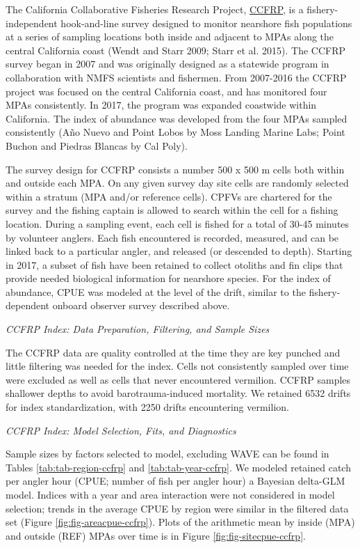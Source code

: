 \documentclass[11pt,
  english,
  a4paper,
]{article}
\begin{document}
The California Collaborative Fisheries Research Project, {\href{https://www.mlml.calstate.edu/ccfrp/}{CCFRP}\leavevmode\tagmcend\tagstructend}, is a fishery-independent hook-and-line survey designed to monitor nearshore fish populations at a series of sampling locations both inside and adjacent to MPAs along the central California coast {(Wendt and Starr 2009; Starr et al. 2015)\leavevmode\tagmcend\tagstructend}. The CCFRP survey began in 2007 and was originally designed as a statewide program in collaboration with NMFS scientists and fishermen. From 2007-2016 the CCFRP project was focused on the central California coast, and has monitored four MPAs consistently. In 2017, the program was expanded coastwide within California. The index of abundance was developed from the four MPAs sampled consistently (Año Nuevo and Point Lobos by Moss Landing Marine Labs; Point Buchon and Piedras Blancas by Cal Poly).

The survey design for CCFRP consists a number 500 x 500 m cells both within and outside each MPA. On any given survey day site cells are randomly selected within a stratum (MPA and/or reference cells). CPFVs are chartered for the survey and the fishing captain is allowed to search within the cell for a fishing location. During a sampling event, each cell is fished for a total of 30-45 minutes by volunteer anglers. Each fish encountered is recorded, measured, and can be linked back to a particular angler, and released (or descended to depth). Starting in 2017, a subset of fish have been retained to collect otoliths and fin clips that provide needed biological information for nearshore species. For the index of abundance, CPUE was modeled at the level of the drift, similar to the fishery-dependent onboard observer survey described above.

\emph{CCFRP Index: Data Preparation, Filtering, and Sample Sizes}

The CCFRP data are quality controlled at the time they are key punched and little filtering was needed for the index. Cells not consistently sampled over time were excluded as well as cells that never encountered vermilion. CCFRP samples shallower depths to avoid barotrauma-induced mortality. We retained 6532 drifts for index standardization, with 2250 drifts encountering vermilion.

\emph{CCFRP Index: Model Selection, Fits, and Diagnostics}

Sample sizes by factors selected to model, excluding WAVE can be found in Tables \ref{tab:tab-region-ccfrp} and \ref{tab:tab-year-ccfrp}. We modeled retained catch per angler hour (CPUE; number of fish per angler hour) a Bayesian delta-GLM model. Indices with a year and area interaction were not considered in model selection; trends in the average CPUE by region were similar in the filtered data set (Figure \ref{fig:fig-areacpue-ccfrp}). Plots of the arithmetic mean by inside (MPA) and outside (REF) MPAs over time is in Figure \ref{fig:fig-sitecpue-ccfrp}.
\end{document}
